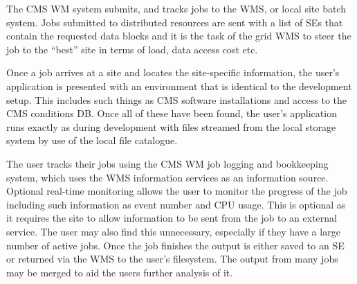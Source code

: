 
The CMS WM system submits, and tracks jobs to the WMS, or local site batch system. Jobs submitted to distributed resources are sent with a list of SEs that contain the requested data blocks and it is the task of the grid WMS to steer the job to the ``best'' site in terms of load, data access cost etc.

Once a job arrives at a site and locates the site-specific information, the user's application is presented with an environment that is identical to the development setup. This includes such things as CMS software installations and access to the CMS conditions DB. Once all of these have been found, the user's application runs exactly as during development with files streamed from the local storage system by use of the local file catalogue.

The user tracks their jobs using the CMS WM job logging and bookkeeping system, which uses the WMS information services as an information source. Optional real-time monitoring allows the user to monitor the progress of the job including such information as event number and CPU usage. This is optional as it requires the site to allow information to be sent from the job to an external service. The user may also find this unnecessary, especially if they have a large number of active jobs. Once the job finishes the output is either saved to an SE or returned via the WMS to the user's filesystem. The output from many jobs may be merged to aid the users further analysis of it.



